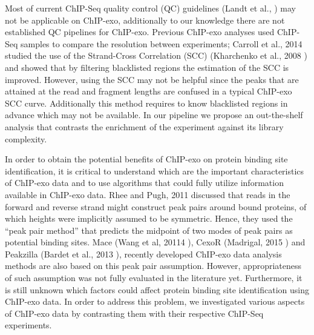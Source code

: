 \documentclass{bmcart}\usepackage[]{graphicx}\usepackage[]{color}
\begin{document}
Most of current ChIP-Seq quality control (QC) guidelines (Landt et
al., \cite{encode_qc}) may not be applicable on ChIP-exo, additionally
to our knowledge there are not established QC pipelines for
ChIP-exo. Previous ChIP-exo analyses used ChIP-Seq samples to compare
the resolution between experiments; Carroll et al., 2014
\cite{carroll.qc} studied the use of the Strand-Cross Correlation
(SCC) (Kharchenko et al., 2008 \cite{strandcc}) and showed that by
filtering blacklisted regions the estimation of the SCC is
improved. However, using the SCC may not be helpful since the peaks
that are attained at the read and fragment lengths are confused in a
typical ChIP-exo SCC curve. Additionally this method requires to know
blacklisted regions in advance which may not be available. In our
pipeline we propose an out-the-shelf analysis that contrasts the
enrichment of the experiment against its library complexity.

In order to obtain the potential benefits of ChIP-exo on protein
binding site identification, it is critical to understand which are
the important characteristics of ChIP-exo data and to use algorithms
that could fully utilize information available in ChIP-exo data. Rhee
and Pugh, 2011 \cite{exo1} discussed that reads in the forward and
reverse strand might construct peak pairs around bound proteins, of
which heights were implicitly assumed to be symmetric. Hence, they
used the ``peak pair method'' that predicts the midpoint of two modes
of peak pairs as potential binding sites. Mace (Wang et al, 20114
\cite{mace}), CexoR (Madrigal, 2015 \cite{cexor}) and Peakzilla
(Bardet et al., 2013 \cite{peakzilla}), recently developed ChIP-exo
data analysis methods are also based on this peak pair
assumption. However, appropriateness of such assumption was not fully
evaluated in the literature yet. Furthermore, it is still unknown
which factors could affect protein binding site identification using
ChIP-exo data. In order to address this problem, we investigated
various aspects of ChIP-exo data by contrasting them with their
respective ChIP-Seq experiments.
\end{document}
